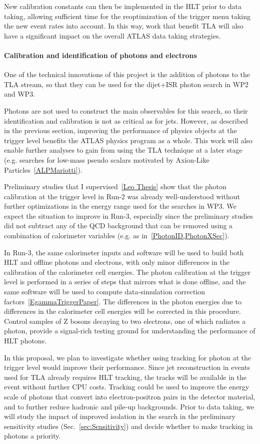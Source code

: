 New calibration constants can then be implemented in the HLT prior to data taking, allowing sufficient time for the reoptimization of the trigger menu taking the new event rates into account. In this way, work that benefit TLA will also have a significant impact on the overall ATLAS data taking strategies. 

\paragraph{Calibration and identification of photons and electrons}
One of the technical innovations of this project is the addition of photons to the TLA stream, so that they can be used for the dijet+ISR photon search in WP2 and WP3.

Photons are not used to construct the main observables for this search, so their identification and calibration is not as critical as for jets. However, as described in the previous section, improving the performance of physics objects at the trigger level benefits the ATLAS physics program as a whole. This work will also enable further analyses to gain from using the TLA technique at a later stage (e.g. searches for low-mass pseudo scalars motivated by Axion-Like Particles~\ref{ALPMariotti}). 

Preliminary studies that I supervised~\ref{Leo Thesis} show that the photon calibration at the trigger level in Run-2 was already well-understood without further optimizations in the energy range used for the searches in WP3. We expect the situation to improve in Run-3, especially since the preliminary studies did not subtract any of the QCD background that can be removed using a combination of calorimeter variables (e.g. as in~\ref{PhotonID,PhotonXSec}). 

In Run-3, the same calorimeter inputs and software will be used to build both HLT and offline photons and electrons, with only minor differences in the calibration of the calorimeter cell energies. The photon calibration at the trigger level is performed in a series of steps that mirrors what is done offline, and the same software will be used to compute data-simulation correction factors~\ref{EgammaTriggerPaper}. The differences in the photon energies due to differences in the calorimeter cell energies will be corrected in this procedure. Control samples of Z bosons decaying to two electrons, one of which radiates a photon, provide a signal-rich testing ground for understanding the performance of HLT photons.  

In this proposal, we plan to investigate whether using tracking for photon at the trigger level would improve their performance. Since jet reconstruction in events used for TLA already requires HLT tracking, the tracks will be available in the event without further CPU costs. Tracking could be used to improve the energy scale of photons that convert into electron-positron pairs in the detector material, and to further reduce hadronic and pile-up backgrounds. Prior to data taking, we will study the impact of improved isolation in the search in the preliminary sensitivity studies (Sec.~\ref{sec:Sensitivity}) and decide whether to make tracking in photons a priority. 


